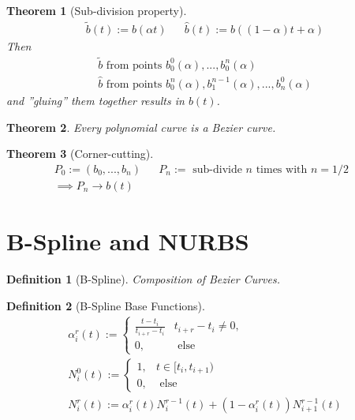 \documentclass[conference]{IEEEtran}
\newtheorem{definition}{Definition}
\newtheorem{theorem}{Theorem}
\begin{document}
\begin{theorem}[Sub-division property]
	\begin{align*}
		\tilde{b}(t) := b(\alpha t) && \hat{b}(t) := b((1-\alpha)t + \alpha)
	\end{align*}
	Then
	\begin{align*}
		\tilde{b} \text{ from points } b_0^0(\alpha), ..., b_0^n(\alpha)\\
		\hat{b} \text{ from points } b_0^n(\alpha), b_1^{n-1}(\alpha), ..., b_n^0(\alpha)
	\end{align*}
	and ''gluing'' them together results in $b(t)$.
\end{theorem}

\begin{theorem}
	Every polynomial curve is a Bezier curve.
\end{theorem}

\begin{theorem}[Corner-cutting]
	\begin{align*}
		P_0 := (b_0, ..., b_n) && P_n := \text{ sub-divide $n$ times with $n=1/2$ }\\
		\implies P_n \rightarrow b(t)
	\end{align*}
\end{theorem}

\section{B-Spline and NURBS}

\begin{definition}[B-Spline]
	Composition of Bezier Curves.
\end{definition}

\begin{definition}[B-Spline Base Functions]
	\begin{align*}
		\alpha_i^r(t) := \begin{cases}
							\frac{t-t_i}{t_{i+r}-t_i} & t_{i+r}-t_i \neq 0,\\
							0, & \text{ else}
						\end{cases}\\
		N_i^0(t) := \begin{cases}
						1, & t \in [t_i, t_{i+1})\\
						0, & \text{ else}
					\end{cases}\\
		N_i^r(t) := \alpha_i^r(t) N_i^{r-1}(t) + (1-\alpha_i^r(t)) N_{i+1}^{r-1}(t)
	\end{align*}
\end{definition}
\end{document}

